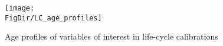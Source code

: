 \hypertarget{LC_age_profiles}{}
\begin{figure}[tbp]
\centerline{\texttt{[image: \\FigDir/LC\_age\_profiles]}}
\caption{Age profiles of variables of interest in life-cycle calibrations}
\label{fig:LC_age_profiles}
\end{figure}
